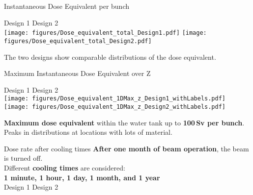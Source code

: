 \documentclass[xcolor={dvipsnames}]{beamer}
\begin{document}
\begin{frame}{Instantaneous Dose Equivalent per bunch}
\begin{center}
\hspace*{1.8cm} Design 1 \hfill Design 2 \hspace*{1.8cm} \\
  \texttt{[image: figures/Dose\_equivalent\_total\_Design1.pdf]}
    \texttt{[image: figures/Dose\_equivalent\_total\_Design2.pdf]}
\end{center}
The two designs show comparable distributions of the dose equivalent.
\end{frame}
\begin{frame}{Maximum Instantaneous Dose Equivalent over Z}
\begin{center}
\hspace*{2cm} Design 1 \hfill Design 2 \hspace*{1.8cm} \\
  \texttt{[image: figures/Dose\_equivalent\_1DMax\_z\_Design1\_withLabels.pdf]}
    \texttt{[image: figures/Dose\_equivalent\_1DMax\_z\_Design2\_withLabels.pdf]}
\end{center}
\textbf{Maximum dose equivalent} within the water tank up to \textbf{100\,Sv per bunch}. Peaks in distributions at locations with lots of material.
\end{frame}
\begin{frame}{Dose rate after cooling times}
\textbf{After one month of beam operation}, the beam is turned off.\\
Different \textbf{cooling times} are considered:\\
\textbf{1 minute, 1 hour, 1 day, 1 month, and 1 year}\\
\vspace*{0.3cm}
\hspace*{1.8cm} Design 1 \hfill Design 2 \hspace*{2.3cm} \\
  \begin{center}
  \end{center}
\end{frame}
\end{document}
